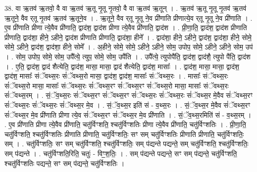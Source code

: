 \documentclass[17pt]{extarticle}
\begin{document}
38. वा ऋ॒तव॑ ऋ॒तवो॒ वै वा ऋ॒तव॑ ऋ॒तू नृ॒तू नृ॒तवो॒ वै वा ऋ॒तव॑ ऋ॒तून् । . ऋ॒तव॑ ऋ॒तू नृ॒तू नृ॒तव॑ ऋ॒तव॑ ऋ॒तूने॒ वैव र्‌तू नृ॒तव॑ ऋ॒तव॑ ऋ॒तूने॒व । . ऋ॒तूने॒ वैव र्‌तू नृ॒तू ने॒व प्री॑णाति प्रीणात्ये॒व र्‌तू नृ॒तू ने॒व प्री॑णाति । . ए॒व प्री॑णाति प्रीणा त्ये॒वैव प्री॑णाति॒ द्वाद॑श॒ द्वाद॑श प्रीणा त्ये॒वैव प्री॑णाति॒ द्वाद॑श । . प्री॒णा॒ति॒ द्वाद॑श॒ द्वाद॑श प्रीणाति प्रीणाति॒ द्वाद॑शा॒ हीने॒ ऽहीने॒ द्वाद॑श प्रीणाति प्रीणाति॒ द्वाद॑शा॒ हीने᳚ । . द्वाद॑शा॒ हीने॒ ऽहीने॒ द्वाद॑श॒ द्वाद॑शा॒ हीने॒ सोमे॒ सोमे॒ ऽहीने॒ द्वाद॑श॒ द्वाद॑शा॒ हीने॒ सोमे᳚ । . अ॒हीने॒ सोमे॒ सोमे॒ ऽहीने॒ ऽहीने॒ सोम॒ उपोप॒ सोमे॒ ऽहीने॒ ऽहीने॒ सोम॒ उप॑ । . सोम॒ उपोप॒ सोमे॒ सोम॒ उपै᳚त्ये॒ त्युप॒ सोमे॒ सोम॒ उपै॑ति । . उपै᳚त्ये॒ त्युपोपै॑ति॒ द्वाद॑श॒ द्वाद॑शै॒ त्युपो पै॑ति॒ द्वाद॑श । . ए॒ति॒ द्वाद॑श॒ द्वाद॑ शैत्येति॒ द्वाद॑श॒ मासा॒ मासा॒ द्वाद॑ शैत्येति॒ द्वाद॑श॒ मासाः᳚ । . द्वाद॑श॒ मासा॒ मासा॒ द्वाद॑श॒ द्वाद॑श॒ मासाः᳚ संॅवथ्स॒रः सं॑ॅवथ्स॒रो मासा॒ द्वाद॑श॒ द्वाद॑श॒ मासाः᳚ संॅवथ्स॒रः । . मासाः᳚ संॅवथ्स॒रः सं॑ॅवथ्स॒रो मासा॒ मासाः᳚ संॅवथ्स॒रः सं॑ॅवथ्स॒रꣳ सं॑ॅवथ्स॒रꣳ सं॑ॅवथ्स॒रो मासा॒ मासाः᳚ संॅवथ्स॒रः सं॑ॅवथ्स॒रम् । . सं॒ॅव॒थ्स॒रः सं॑ॅवथ्स॒रꣳ सं॑ॅवथ्स॒रꣳ सं॑ॅवथ्स॒रः सं॑ॅवथ्स॒रः सं॑ॅवथ्स॒र मे॒वैव सं॑ॅवथ्स॒रꣳ सं॑ॅवथ्स॒रः सं॑ॅवथ्स॒रः सं॑ॅवथ्स॒र मे॒व । . सं॒ॅव॒थ्स॒र इति॑ सं - व॒थ्स॒रः । . सं॒ॅव॒थ्स॒र मे॒वैव सं॑ॅवथ्स॒रꣳ सं॑ॅवथ्स॒र मे॒व प्री॑णाति प्रीणा त्ये॒व सं॑ॅवथ्स॒रꣳ सं॑ॅवथ्स॒र मे॒व प्री॑णाति । . सं॒ॅव॒थ्स॒रमिति॑ सं - व॒थ्स॒रम् । . ए॒व प्री॑णाति प्रीणा त्ये॒वैव प्री॑णाति॒ चतु॑र्विꣳशति॒ श्चतु॑र्विꣳशतिः प्रीणा त्ये॒वैव प्री॑णाति॒ चतु॑र्विꣳशतिः । . प्री॒णा॒ति॒ चतु॑र्विꣳशति॒ श्चतु॑र्विꣳशतिः प्रीणाति प्रीणाति॒ चतु॑र्विꣳशतिः॒ सꣳ सम् चतु॑र्विꣳशतिः प्रीणाति प्रीणाति॒ चतु॑र्विꣳशतिः॒ सम् । . चतु॑र्विꣳशतिः॒ सꣳ सम् चतु॑र्विꣳशति॒ श्चतु॑र्विꣳशतिः॒ सम् प॑द्यन्ते पद्यन्ते॒ सम् चतु॑र्विꣳशति॒ श्चतु॑र्विꣳशतिः॒ सम् प॑द्यन्ते । . चतु॑र्विꣳशति॒रिति॒ चतुः॑ - विꣳ॒॒श॒तिः॒ । . सम् प॑द्यन्ते पद्यन्ते॒ सꣳ सम् प॑द्यन्ते॒ चतु॑र्विꣳशति॒ श्चतु॑र्विꣳशतिः पद्यन्ते॒ सꣳ सम् प॑द्यन्ते॒ चतु॑र्विꣳशतिः । \newline
\pagebreak
{}
\end{document}
